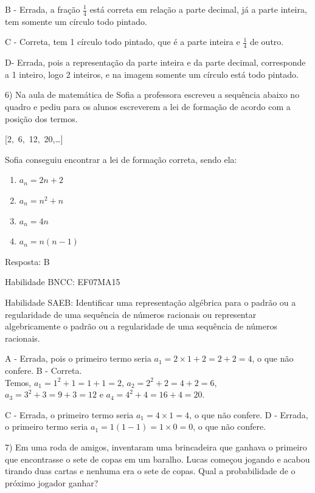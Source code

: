 B - Errada, a fração \(\frac{1}{4}\) está correta em relação a parte
decimal, já a parte inteira, tem somente um círculo todo pintado.

C - Correta, tem 1 círculo todo pintado, que é a parte inteira e
\(\frac{1}{4}\) de outro.

D- Errada, pois a representação da parte inteira e da parte decimal,
corresponde a 1 inteiro, logo 2 inteiros, e na imagem somente um círculo
está todo pintado.

6) Na aula de matemática de Sofia a professora escreveu a sequência
abaixo no quadro e pediu para os alunos escreverem a lei de formação de
acordo com a posição dos termos.

[2,\ 6,\ 12,\ 20,\ldots]

Sofia conseguiu encontrar a lei de formação correta, sendo ela:

\begin{enumerate}
\def\labelenumi{\alph{enumi})}
\item
  \(a_{n} = 2n + 2\)
\item
  \(a_{n} = n^2 + n\)
\item
  \(a_{n} = 4n\)
\item
  \(a_{n} = n(n - 1)\)
\end{enumerate}

Resposta: B

Habilidade BNCC: EF07MA15

Habilidade SAEB: Identificar uma representação algébrica para o padrão
ou a regularidade de uma sequência de números racionais ou representar
algebricamente o padrão ou a regularidade de uma sequência de números
racionais.

A - Errada, pois o primeiro termo seria
\(a_{1} = 2 \times 1 + 2 = 2 + 2 = 4\), o que não confere. B -
Correta.\\
Temos, \(a_{1} = 1^{2} + 1 = 1 + 1 = 2\),
\(a_{2} = 2^{2} + 2 = 4 + 2 = 6\), \(a_{3} = 3^{2} + 3 = 9 + 3 = 12\) e
\(a_{4} = 4^2 + 4 = 16 + 4 = 20\).

C - Errada, o primeiro termo seria \(a_{1} = 4 \times 1 = 4\)\emph{,} o
que não confere.\emph{\hfill\break
}D - Errada, o primeiro termo seria
\(a_{1} = 1\left( 1 - 1 \right) = 1 \times 0 = 0\), o que não confere.

7) Em uma roda de amigos, inventaram uma brincadeira que ganhava o
primeiro que encontrasse o sete de copas em um baralho. Lucas começou
jogando e acabou tirando duas cartas e nenhuma era o sete de copas. Qual
a probabilidade de o próximo jogador ganhar?

